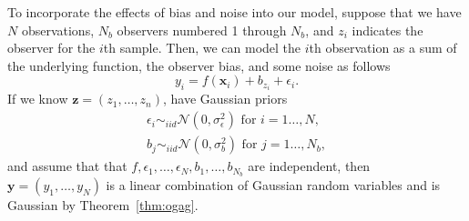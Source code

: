 To incorporate the effects of bias and noise into our model, suppose that we have $N$ observations, $N_b$ observers numbered 1 through $N_b$, and $z_i$ indicates the observer for the $i$th sample.
Then, we can model the $i$th observation as a sum of the underlying function, the observer bias, and some noise as follows
\begin{equation*}
    y_i = f(\mathbf{x}_i) + b_{z_i} + \epsilon_i.
\end{equation*}
If we know $\mathbf{z} = (z_1, \dots, z_n)$,
have Gaussian priors
\begin{align*}
    \epsilon_i \sim_{iid} \mathcal{N}(0, \sigma^2_{\epsilon}) \text{ for $i = 1 \dots, N$}, \\
    b_j \sim_{iid} \mathcal{N}(0, \sigma_{b}^2) \text{ for $j = 1 \dots, N_b$},
\end{align*}
and assume that that $f, \epsilon_1, \dots, \epsilon_N, b_1, \dots, b_{N_b}$ are independent,
then $\mathbf{y} = (y_1, \dots, y_N)$ is a linear combination of Gaussian random variables
and is Gaussian by Theorem~\ref{thm:ogag}.

